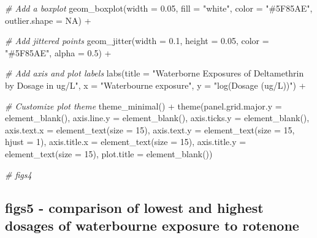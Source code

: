 \documentclass[
]{article}
\newenvironment{Shaded}{\begin{snugshade}}{\end{snugshade}}
\newcommand{\AttributeTok}[1]{\textcolor[rgb]{0.77,0.63,0.00}{#1}}
\newcommand{\CommentTok}[1]{\textcolor[rgb]{0.56,0.35,0.01}{\textit{#1}}}
\newcommand{\ConstantTok}[1]{\textcolor[rgb]{0.00,0.00,0.00}{#1}}
\newcommand{\DecValTok}[1]{\textcolor[rgb]{0.00,0.00,0.81}{#1}}
\newcommand{\FloatTok}[1]{\textcolor[rgb]{0.00,0.00,0.81}{#1}}
\newcommand{\FunctionTok}[1]{\textcolor[rgb]{0.00,0.00,0.00}{#1}}
\newcommand{\NormalTok}[1]{#1}
\newcommand{\SpecialCharTok}[1]{\textcolor[rgb]{0.00,0.00,0.00}{#1}}
\newcommand{\StringTok}[1]{\textcolor[rgb]{0.31,0.60,0.02}{#1}}
\begin{document}
\begin{Shaded}
\begin{Highlighting}[]
  \CommentTok{\# Add a boxplot }
  \FunctionTok{geom\_boxplot}\NormalTok{(}\AttributeTok{width =} \FloatTok{0.05}\NormalTok{, }\AttributeTok{fill =} \StringTok{"white"}\NormalTok{, }\AttributeTok{color =} \StringTok{"\#5F85AE"}\NormalTok{, }\AttributeTok{outlier.shape =} \ConstantTok{NA}\NormalTok{) }\SpecialCharTok{+}
  
  \CommentTok{\# Add jittered points}
  \FunctionTok{geom\_jitter}\NormalTok{(}\AttributeTok{width =} \FloatTok{0.1}\NormalTok{, }\AttributeTok{height =} \FloatTok{0.05}\NormalTok{, }\AttributeTok{color =} \StringTok{"\#5F85AE"}\NormalTok{, }\AttributeTok{alpha =} \FloatTok{0.5}\NormalTok{) }\SpecialCharTok{+}
  
  \CommentTok{\# Add axis and plot labels}
  \FunctionTok{labs}\NormalTok{(}\AttributeTok{title =} \StringTok{"Waterborne Exposures of Deltamethrin by Dosage in ug/L"}\NormalTok{, }\AttributeTok{x =} \StringTok{"Waterbourne exposure"}\NormalTok{, }\AttributeTok{y =} \StringTok{"log(Dosage (ug/L))"}\NormalTok{) }\SpecialCharTok{+}
  
  \CommentTok{\# Customize plot theme}
  \FunctionTok{theme\_minimal}\NormalTok{() }\SpecialCharTok{+}
  \FunctionTok{theme}\NormalTok{(}\AttributeTok{panel.grid.major.y =} \FunctionTok{element\_blank}\NormalTok{(),}
        \AttributeTok{axis.line.y =} \FunctionTok{element\_blank}\NormalTok{(),}
        \AttributeTok{axis.ticks.y =} \FunctionTok{element\_blank}\NormalTok{(),}
        \AttributeTok{axis.text.x =} \FunctionTok{element\_text}\NormalTok{(}\AttributeTok{size =} \DecValTok{15}\NormalTok{),}
        \AttributeTok{axis.text.y =} \FunctionTok{element\_text}\NormalTok{(}\AttributeTok{size =} \DecValTok{15}\NormalTok{, }\AttributeTok{hjust =} \DecValTok{1}\NormalTok{),}
        \AttributeTok{axis.title.x =} \FunctionTok{element\_text}\NormalTok{(}\AttributeTok{size =} \DecValTok{15}\NormalTok{),}
        \AttributeTok{axis.title.y =} \FunctionTok{element\_text}\NormalTok{(}\AttributeTok{size =} \DecValTok{15}\NormalTok{),}
        \AttributeTok{plot.title =} \FunctionTok{element\_blank}\NormalTok{())}

\CommentTok{\# figs4}
\end{Highlighting}
\end{Shaded}

\hypertarget{figs5---comparison-of-lowest-and-highest-dosages-of-waterbourne-exposure-to-rotenone}{%
\subsection{figs5 - comparison of lowest and highest dosages of
waterbourne exposure to
rotenone}\label{figs5---comparison-of-lowest-and-highest-dosages-of-waterbourne-exposure-to-rotenone}}
\end{document}

